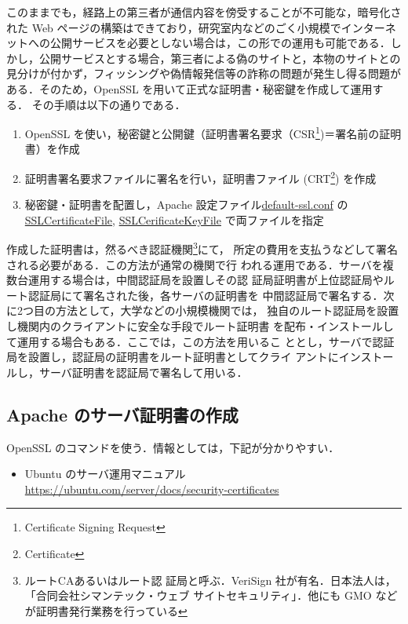 このままでも，経路上の第三者が通信内容を傍受することが不可能な，暗号化さ
れた Web ページの構築はできており，研究室内などのごく小規模でインターネ
ットへの公開サービスを必要としない場合は，この形での運用も可能である．し
かし，公開サービスとする場合，第三者による偽のサイトと，本物のサイトとの
見分けが付かず，フィッシングや偽情報発信等の詐称の問題が発生し得る問題が
ある．そのため，OpenSSL を用いて正式な証明書・秘密鍵を作成して運用する．
その手順は以下の通りである．

\begin{enumerate}
 \item OpenSSL を使い，秘密鍵と公開鍵（証明書署名要求（CSR\footnote{Certificate Signing Request})＝署名前の証明書）を作成
 \item 証明書署名要求ファイルに署名を行い，証明書ファイル (CRT\footnote{Certificate}) を作成
 \item 秘密鍵・証明書を配置し，Apache 設定ファイル\url{default-ssl.conf} の\url{SSLCertificateFile}, \url{SSLCerificateKeyFile} で両ファイルを指定
\end{enumerate}

作成した証明書は，然るべき認証機関\footnote{ルートCAあるいはルート認
証局と呼ぶ．VeriSign 社が有名．日本法人は，「合同会社シマンテック・ウェブ
サイトセキュリティ」．他にも GMO などが証明書発行業務を行っている}にて，
所定の費用を支払うなどして署名される必要がある．この方法が通常の機関で行
われる運用である．サーバを複数台運用する場合は，中間認証局を設置しその認
証局証明書が上位認証局やルート認証局にて署名された後，各サーバの証明書を
中間認証局で署名する．次に2つ目の方法として，大学などの小規模機関では，
独自のルート認証局を設置し機関内のクライアントに安全な手段でルート証明書
を配布・インストールして運用する場合もある．ここでは，この方法を用いるこ
ととし，サーバで認証局を設置し，認証局の証明書をルート証明書としてクライ
アントにインストールし，サーバ証明書を認証局で署名して用いる．

\subsection{Apache のサーバ証明書の作成}

OpenSSL のコマンドを使う．情報としては，下記が分かりやすい．
\begin{itemize}
 \item Ubuntu のサーバ運用マニュアル\\
 \url{https://ubuntu.com/server/docs/security-certificates}
\end{itemize}

